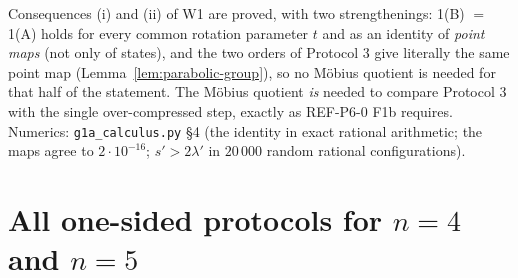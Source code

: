 \documentclass[11pt]{article}
\theoremstyle{definition}\newtheorem{example}[theorem]{Example}
\begin{document}
\begin{verdictok}
Consequences (i) and (ii) of W1 are proved, with two strengthenings: 1(B) $=$ 1(A) holds for every
common rotation parameter $t$ and as an identity of \emph{point maps} (not only of states), and
the two orders of Protocol 3 give literally the same point map
(Lemma~\ref{lem:parabolic-group}), so no M\"obius quotient is needed for that half of the
statement.  The M\"obius quotient \emph{is} needed to compare Protocol 3 with the single
over-compressed step, exactly as REF-P6-0 F1b requires.  Numerics: \texttt{g1a\_calculus.py} \S4
(the identity in exact rational arithmetic; the maps agree to $2\cdot10^{-16}$; $s'>2\lambda'$
in $20\,000$ random rational configurations).
\end{verdictok}

\section{All one-sided protocols for $n=4$ and $n=5$}\label{sec:tables}
\end{document}
